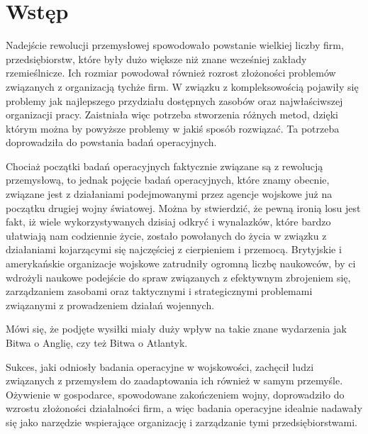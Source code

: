 \chapter{Wstęp}
\label{cha:wstep}
Nadejście rewolucji przemysłowej spowodowało powstanie wielkiej liczby firm, przedsiębiorstw, które były dużo większe niż znane wcześniej zakłady rzemieślnicze. Ich rozmiar powodował również rozrost złożoności problemów związanych z organizacją tychże firm. W związku z kompleksowością pojawiły się problemy jak najlepszego przydziału dostępnych zasobów oraz najwłaściwszej organizacji pracy. Zaistniała więc potrzeba stworzenia różnych metod, dzięki którym można by powyższe problemy w jakiś sposób rozwiązać. Ta potrzeba doprowadziła do powstania badań operacyjnych.

Chociaż początki badań operacyjnych faktycznie związane są z rewolucją przemysłową, to jednak pojęcie badań operacyjnych, które znamy obecnie, związane jest z działaniami podejmowanymi przez agencje wojskowe już na początku drugiej wojny światowej. Można by stwierdzić, że pewną ironią losu jest fakt, iż wiele wykorzystywanych dzisiaj odkryć i wynalazków, które bardzo ułatwiają nam  codziennie życie, zostało powołanych do życia w związku z działaniami kojarzącymi się najczęściej z cierpieniem i przemocą. 
Brytyjskie i amerykańskie organizacje wojskowe zatrudniły ogromną liczbę naukowców, by ci wdrożyli naukowe podejście do spraw związanych z efektywnym zbrojeniem się, zarządzaniem zasobami oraz taktycznymi i strategicznymi problemami związanymi z prowadzeniem działań wojennych.

Mówi się, że podjęte wysiłki miały duży wpływ na takie znane wydarzenia jak Bitwa o Anglię, czy też Bitwa o Atlantyk.

Sukces, jaki odniosły badania operacyjne w wojskowości, zachęcił ludzi związanych z przemysłem do zaadaptowania ich również w samym przemyśle. Ożywienie w gospodarce, spowodowane zakończeniem wojny, doprowadziło do wzrostu złożoności działalności firm, a więc badania operacyjne idealnie nadawały się jako narzędzie wspierające organizację i zarządzanie tymi przedsiębiorstwami. 

